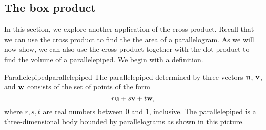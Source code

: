 \subsection{The box product}

In this section, we explore another application of the cross product.
Recall that we can use the cross product to find the the area of a
parallelogram. As we will now show, we can also use the cross product
together with the dot product to find the volume of a
parallelepiped. We begin with a definition.

\begin{definition}{Parallelepiped}{parallelepiped}
  The parallelepiped determined by three
  vectors $\mbox{\bf u}$, $\mbox{\bf v}$, and $\mbox{\bf w}$ consists of the set of
  points of the form
  \begin{equation*}
    r\/\mbox{\bf u}+s\/\mbox{\bf v}+t\/\mbox{\bf w},
  \end{equation*}
  where $r,s,t$ are real numbers between $0$ and $1$, inclusive. The
  parallelepiped is a three-dimensional body bounded by parallelograms
  as shown in this picture.
  \begin{center}
  \end{center}
\end{definition}

